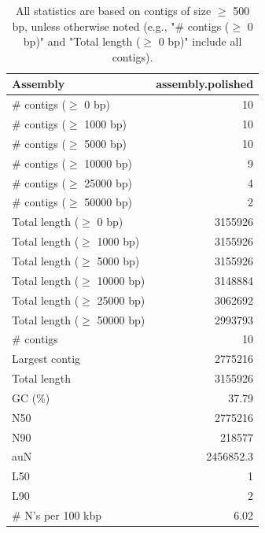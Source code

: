\documentclass[12pt,a4paper]{article}
\begin{document}
\begin{table}[ht]
\begin{center}
\caption{All statistics are based on contigs of size $\geq$ 500 bp, unless otherwise noted (e.g., "\# contigs ($\geq$ 0 bp)" and "Total length ($\geq$ 0 bp)" include all contigs).}
\begin{tabular}{|l*{1}{|r}|}
\hline
Assembly & assembly.polished \\ \hline
\# contigs ($\geq$ 0 bp) & 10 \\ \hline
\# contigs ($\geq$ 1000 bp) & 10 \\ \hline
\# contigs ($\geq$ 5000 bp) & 10 \\ \hline
\# contigs ($\geq$ 10000 bp) & 9 \\ \hline
\# contigs ($\geq$ 25000 bp) & 4 \\ \hline
\# contigs ($\geq$ 50000 bp) & 2 \\ \hline
Total length ($\geq$ 0 bp) & 3155926 \\ \hline
Total length ($\geq$ 1000 bp) & 3155926 \\ \hline
Total length ($\geq$ 5000 bp) & 3155926 \\ \hline
Total length ($\geq$ 10000 bp) & 3148884 \\ \hline
Total length ($\geq$ 25000 bp) & 3062692 \\ \hline
Total length ($\geq$ 50000 bp) & 2993793 \\ \hline
\# contigs & 10 \\ \hline
Largest contig & 2775216 \\ \hline
Total length & 3155926 \\ \hline
GC (\%) & 37.79 \\ \hline
N50 & 2775216 \\ \hline
N90 & 218577 \\ \hline
auN & 2456852.3 \\ \hline
L50 & 1 \\ \hline
L90 & 2 \\ \hline
\# N's per 100 kbp & 6.02 \\ \hline
\end{tabular}
\end{center}
\end{table}
\end{document}
